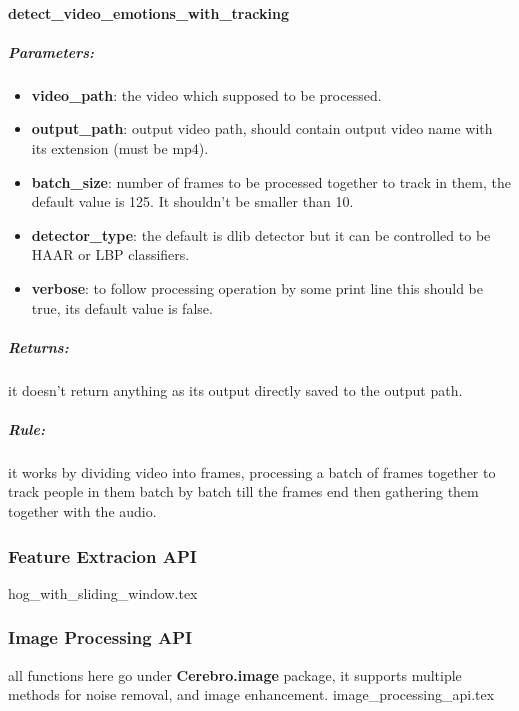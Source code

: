 \paragraph{detect\_video\_emotions\_with\_tracking}
\subparagraph{Parameters:}
\begin{changemargin}{0.5cm}{0cm} 
\begin{itemize}
	\item  \textbf{video\_path}: the video which supposed to be processed.
	\item  \textbf{output\_path}: output video path, should contain output video name with its extension (must be mp4).
	\item  \textbf{batch\_size}: number of frames to be processed together to track in them, the default value is 125. \newline It shouldn't be smaller than 10.
	\item \textbf{detector\_type}: the default is dlib detector but it can be controlled to be HAAR or LBP classifiers.
	\item  \textbf{verbose}: to follow processing operation by some print line this should be true, its default value is false.
\end{itemize}
\end{changemargin}

\subparagraph{Returns:}
\begin{changemargin}{1cm}{0cm}
	it doesn't return anything as its output directly saved to the output path.
\end{changemargin}


\subparagraph{Rule:}
\begin{changemargin}{1cm}{0cm}
it works by dividing video into frames, processing a batch of frames together to track people in them batch by batch till the frames end then gathering them together with the audio.
\end{changemargin}

\subsubsection{Feature Extracion API}
{hog_with_sliding_window.tex}

\subsubsection{Image Processing API}
all functions here go under \textbf{Cerebro.image} package, it supports multiple methods for noise removal, and image enhancement. 
{image_processing_api.tex}